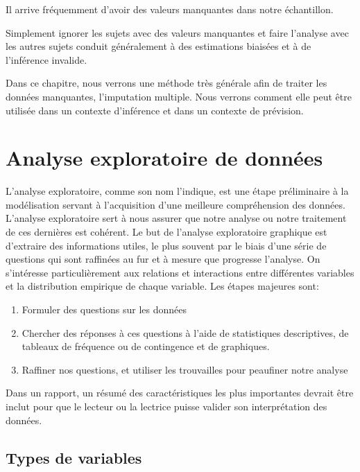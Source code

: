 \documentclass[
  11pt,
  letterpaper,
]{book}
\providecommand{\tightlist}{%
  \setlength{\itemsep}{0pt}\setlength{\parskip}{0pt}}
\theoremstyle{definition}
\theoremstyle{definition}
\theoremstyle{definition}
\theoremstyle{definition}
\theoremstyle{remark}
\begin{document}
Il arrive fréquemment d'avoir des valeurs manquantes dans notre échantillon.

Simplement ignorer les sujets avec des valeurs manquantes et faire l'analyse avec les autres sujets conduit généralement à des estimations biaisées et à de l'inférence invalide.

Dans ce chapitre, nous verrons une méthode très générale afin de traiter les données manquantes, l'imputation multiple. Nous verrons comment elle peut être utilisée dans un contexte d'inférence et dans un contexte de prévision.

\hypertarget{analyse-exploratoire}{%
\section{Analyse exploratoire de données}\label{analyse-exploratoire}}

L'analyse exploratoire, comme son nom l'indique, est une étape préliminaire à la modélisation servant à l'acquisition d'une meilleure compréhension des données.
L'analyse exploratoire sert à nous assurer que notre analyse ou notre traitement de ces dernières est cohérent. Le but de l'analyse exploratoire graphique est d'extraire des informations utiles, le plus souvent par le biais d'une série de questions qui sont raffinées au fur et à mesure que progresse l'analyse. On s'intéresse particulièrement aux relations et interactions entre différentes variables et la distribution empirique de chaque variable. Les étapes majeures sont:

\begin{enumerate}
\def\labelenumi{\arabic{enumi}.}
\tightlist
\item
  Formuler des questions sur les données
\item
  Chercher des réponses à ces questions à l'aide de statistiques descriptives, de tableaux de fréquence ou de contingence et de graphiques.
\item
  Raffiner nos questions, et utiliser les trouvailles pour peaufiner notre analyse
\end{enumerate}

Dans un rapport, un résumé des caractéristiques les plus importantes devrait être inclut pour que le lecteur ou la lectrice puisse valider son interprétation des données.

\hypertarget{types-de-variables}{%
\subsection{Types de variables}\label{types-de-variables}}
\end{document}
